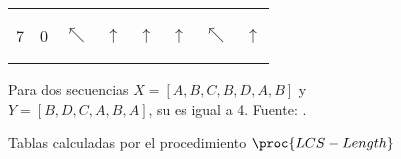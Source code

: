 \begin{figure}[!h]
{\begin{tabular}{cccccccc}
\multicolumn{1}{c|}{7} & \multicolumn{1}{c|}{0} & \multicolumn{1}{c|}{\begin{tiny}$\nwarrow$\end{tiny}} & \multicolumn{1}{c|}{\begin{tiny}$\uparrow$\end{tiny}} & \multicolumn{1}{c|}{\begin{tiny}$\uparrow$\end{tiny}} & \multicolumn{1}{c|}{\begin{tiny}$\uparrow$\end{tiny}} & \multicolumn{1}{c|}{\begin{tiny}$\nwarrow$\end{tiny}} & \multicolumn{1}{c|}{\begin{tiny}$\uparrow$\end{tiny}} \\ \cline{2-8}
\end{tabular}}
\caption{Tablas calculadas por el procedimiento $\proc{LCS-Length}$}
Para dos secuencias $X=[A,B,C,B,D,A,B]$ y $Y=[B,D,C,A,B,A]$, su  es igual a 4.
Fuente: \cite{Cormen2009}.
\label{tablesLcs}
\end{figure}
